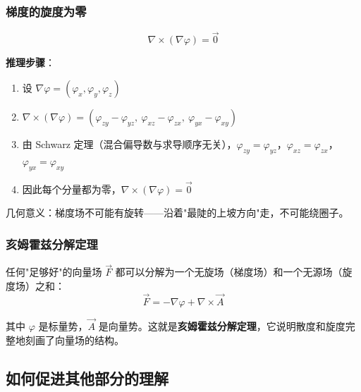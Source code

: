 \subsubsection{梯度的旋度为零}

\[
\nabla\times(\nabla\varphi) = \vec{0}
\]

\begin{insightbox}
\textbf{推理步骤}：
\begin{enumerate}[leftmargin=2em]
    \item 设 $\nabla\varphi = (\varphi_x, \varphi_y, \varphi_z)$
    \item $\nabla\times(\nabla\varphi) = (\varphi_{zy}-\varphi_{yz},\ \varphi_{xz}-\varphi_{zx},\ \varphi_{yx}-\varphi_{xy})$
    \item 由 Schwarz 定理（混合偏导数与求导顺序无关），$\varphi_{zy}=\varphi_{yz}$，$\varphi_{xz}=\varphi_{zx}$，$\varphi_{yx}=\varphi_{xy}$
    \item 因此每个分量都为零，$\nabla\times(\nabla\varphi)=\vec{0}$
\end{enumerate}
几何意义：梯度场不可能有旋转——沿着"最陡的上坡方向"走，不可能绕圈子。
\end{insightbox}

\subsubsection{亥姆霍兹分解定理}

任何"足够好"的向量场 $\vec{F}$ 都可以分解为一个无旋场（梯度场）和一个无源场（旋度场）之和：
\[
\vec{F} = -\nabla\varphi + \nabla\times\vec{A}
\]

其中 $\varphi$ 是标量势，$\vec{A}$ 是向量势。这就是\textbf{亥姆霍兹分解定理}，它说明散度和旋度完整地刻画了向量场的结构。

\subsection{如何促进其他部分的理解}

